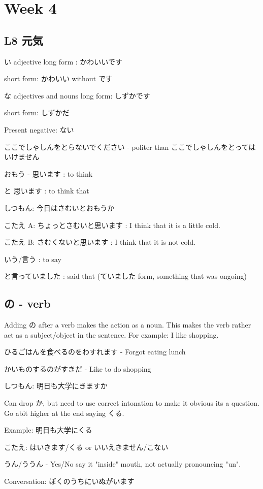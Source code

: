\section{Week 4}
\subsection{L8 元気}

い adjective long form : かわいいです

short form: かわいい without です

な adjectives and nouns long form: しずかです

short form: しずかだ

Present negative: ない

ここでしゃしんをとらないでください - politer than ここでしゃしんをとってはいけません

おもう - 思います : to think

と 思います : to think that

しつもん: 今日はさむいとおもうか

こたえ A: ちょっとさむいと思います : I think that it is a little cold.

こたえ B: さむくないと思います : I think that it is not cold.

いう/言う : to say

と言っていました : said that (ていました form, something that was ongoing)

\subsection{の - verb}
Adding の after a verb makes the action as a noun. This makes the verb rather act as a subject/object in the sentence.
For example: I like shopping.

ひるごはんを食べるのをわすれます - Forgot eating lunch

かいものするのがすきだ - Like to do shopping

しつもん: 明日も大学にきますか

Can drop か, but need to use correct intonation to make it obvious its a question. Go abit higher at the end saying くる.

Example: 明日も大学にくる

こたえ: はいきます/くる or いいえきません/こない

うん/ううん - Yes/No say it "inside" mouth, not actually pronouncing "un".

Conversation:
ぼくのうちにいぬがいます

